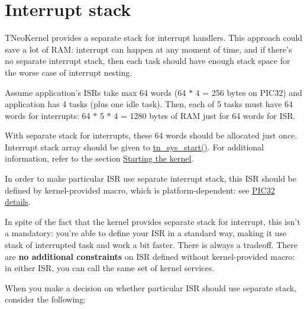 \hypertarget{interrupts_interrupt_stack}{}\section{Interrupt stack}\label{interrupts_interrupt_stack}
T\+Neo\+Kernel provides a separate stack for interrupt handlers. This approach could save a lot of R\+A\+M\+: interrupt can happen at any moment of time, and if there's no separate interrupt stack, then each task should have enough stack space for the worse case of interrupt nesting.

Assume application's I\+S\+Rs take max 64 words (64 $\ast$ 4 = 256 bytes on P\+I\+C32) and application has 4 tasks (plus one idle task). Then, each of 5 tasks must have 64 words for interrupts\+: 64 $\ast$ 5 $\ast$ 4 = 1280 bytes of R\+A\+M just for 64 words for I\+S\+R.

With separate stack for interrupts, these 64 words should be allocated just once. Interrupt stack array should be given to {\ttfamily \hyperlink{tn__sys_8h_a62ab25d9d8ca01c02d368968f19e49bf}{tn\+\_\+sys\+\_\+start()}}. For additional information, refer to the section \hyperlink{quick_guide_starting_the_kernel}{Starting the kernel}.

In order to make particular I\+S\+R use separate interrupt stack, this I\+S\+R should be defined by kernel-\/provided macro, which is platform-\/dependent\+: see \hyperlink{pic32_details}{P\+I\+C32 details}.

In spite of the fact that the kernel provides separate stack for interrupt, this isn't a mandatory\+: you're able to define your I\+S\+R in a standard way, making it use stask of interrupted task and work a bit faster. There is always a tradeoff. There are {\bfseries no additional constraints} on I\+S\+R defined without kernel-\/provided macro\+: in either I\+S\+R, you can call the same set of kernel services.

When you make a decision on whether particular I\+S\+R should use separate stack, consider the following\+:


